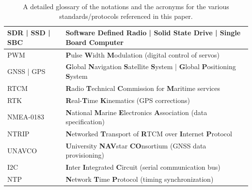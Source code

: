 \documentclass[12pt, draftcls, onecolumn]{IEEEtran}
\begin{document}
\begin{table} [tb]
\begin{tabular}{|l||l|}
		\hline
		SDR | SSD | SBC & \textbf{S}oftware \textbf{D}efined \textbf{R}adio | \textbf{S}olid \textbf{S}tate \textbf{D}rive | \textbf{S}ingle \textbf{B}oard \textbf{C}omputer\\
		\hline
		PWM & \textbf{P}ulse \textbf{W}idth \textbf{M}odulation (digital control of servos)\\
		\hline
		GNSS | GPS & \textbf{G}lobal \textbf{N}avigation \textbf{S}atellite \textbf{S}ystem | \textbf{G}lobal \textbf{P}ositioning \textbf{S}ystem\\
		\hline
		RTCM & \textbf{R}adio \textbf{T}echnical \textbf{C}ommission for \textbf{M}aritime services\\
		\hline
		RTK & \textbf{R}eal-\textbf{T}ime \textbf{K}inematics (GPS corrections)\\
		\hline
		NMEA-0183 & \textbf{N}ational \textbf{M}arine \textbf{E}lectronics \textbf{A}ssociation (data specification)\\
		\hline
		NTRIP & \textbf{N}etworked \textbf{T}ransport of \textbf{R}TCM over \textbf{I}nternet \textbf{P}rotocol\\
		\hline
		UNAVCO & \textbf{U}niversity \textbf{NAV}star \textbf{CO}nsortium (GNSS data provisioning)\\
		\hline
		I$2$C & \textbf{I}nter \textbf{I}ntegrated \textbf{C}ircuit (serial communication bus)\\
		\hline
		NTP & \textbf{N}etwork \textbf{T}ime \textbf{P}rotocol (timing synchronization)\\
		\hline
	\end{tabular}
	\vspace{-1mm}
	\caption{A detailed glossary of the notations and the acronyms for the various standards/protocols referenced in this paper.}
	\label{T1}
\end{table}
\end{document}
